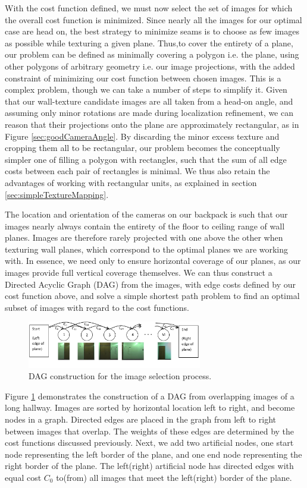 \documentclass[10pt,twocolumn,letterpaper]{article}
\begin{document}
With the cost function defined, we must now select the set of images
for which the overall cost function is minimized. Since nearly all the
images for our optimal case are head on, the best strategy to minimize
seams is to choose as few images as possible while texturing a given
plane. Thus,to cover the entirety of a plane, our problem can be
defined as minimally covering a polygon i.e. the plane, using other
polygons of arbitrary geometry i.e. our image projections, with the
added constraint of minimizing our cost function between chosen
images.  This is a complex problem, though we can take a number of
steps to simplify it. Given that our wall-texture candidate images are
all taken from a head-on angle, and assuming only minor rotations are
made during localization refinement, we can reason that their
projections onto the plane are approximately rectangular, as in Figure
\ref{sec:goodCameraAngle}. By discarding the minor excess texture and
cropping them all to be rectangular, our problem becomes the
conceptually simpler one of filling a polygon with rectangles, such
that the sum of all edge costs between each pair of rectangles is
minimal. We thus also retain the advantages of working with
rectangular units, as explained in section
\ref{sec:simpleTextureMapping}.

The location and orientation of the cameras on our backpack is such
that our images nearly always contain the entirety of the floor to
ceiling range of wall planes. Images are therefore rarely projected
with one above the other when texturing wall planes, which correspond
to the optimal planes we are working with.  In essence, we need only
to ensure horizontal coverage of our planes, as our images provide
full vertical coverage themselves. We can thus construct a Directed
Acyclic Graph (DAG) from the images, with edge costs defined by our
cost function above, and solve a simple shortest path problem to find
an optimal subset of images with regard to the cost functions.

\begin{figure}
  \centering
  \includegraphics[width=3in]{dagCreation.pdf}
  \caption{DAG construction for the image selection process.}
  \label{fig:dagCreation}
\end{figure}

Figure \ref{fig:dagCreation} demonstrates the construction of a DAG
from overlapping images of a long hallway. Images are sorted by
horizontal location left to right, and become nodes in a
graph. Directed edges are placed in the graph from left to right
between images that overlap. The weights of these edges are determined
by the cost functions discussed previously. Next, we add two
artificial nodes, one start node representing the left border of the
plane, and one end node representing the right border of the
plane. The left(right) artificial node has directed edges with equal
cost $C_0$ to(from) all images that meet the left(right) border of the
plane.
\end{document}
